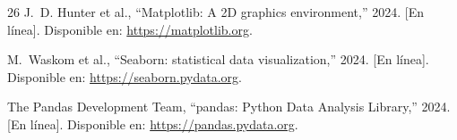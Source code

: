 \documentclass[conference]{IEEEtran}
\begin{document}
\begin{thebibliography}{26}
J.~D. Hunter et al., ``Matplotlib: A 2D graphics environment,'' 2024. [En línea].
Disponible en: \url{https://matplotlib.org}.

M.~Waskom et al., ``Seaborn: statistical data visualization,'' 2024. [En línea].
Disponible en: \url{https://seaborn.pydata.org}.

{The Pandas Development Team}, ``pandas: Python Data Analysis Library,'' 2024.
[En línea]. Disponible en: \url{https://pandas.pydata.org}.

\end{thebibliography}
\end{document}
